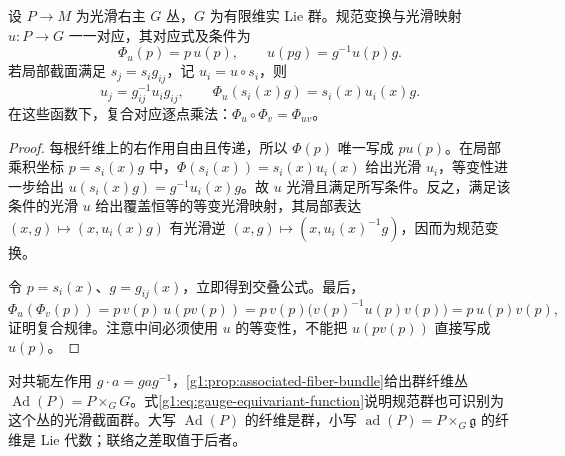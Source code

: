 \begin{proposition}\label{g1:prop:gauge-equivariant-functions}
	设 \(P\to M\) 为光滑右主 \(G\) 丛，\(G\) 为有限维实 Lie 群。规范变换与光滑映射 \(u:P\to G\) 一一对应，其对应式及条件为
	\begin{equation}\label{g1:eq:gauge-equivariant-function}
		\Phi_u(p)=p\,u(p),\qquad u(pg)=g^{-1}u(p)g.
	\end{equation}
	若局部截面满足 \(s_j=s_i g_{ij}\)，记 \(u_i=u\circ s_i\)，则
	\[
		u_j=g_{ij}^{-1}u_i g_{ij},\qquad
		\Phi_u(s_i(x)g)=s_i(x)u_i(x)g.
	\]
	在这些函数下，复合对应逐点乘法：\(\Phi_u\circ\Phi_v=\Phi_{uv}\)。
\end{proposition}
\begin{proof}
	每根纤维上的右作用自由且传递，所以 \(\Phi(p)\) 唯一写成 \(p u(p)\)。在局部乘积坐标 \(p=s_i(x)g\) 中，\(\Phi(s_i(x))=s_i(x)u_i(x)\) 给出光滑 \(u_i\)，等变性进一步给出 \(u(s_i(x)g)=g^{-1}u_i(x)g\)。故 \(u\) 光滑且满足所写条件。反之，满足该条件的光滑 \(u\) 给出覆盖恒等的等变光滑映射，其局部表达 \((x,g)\mapsto(x,u_i(x)g)\) 有光滑逆 \((x,g)\mapsto(x,u_i(x)^{-1}g)\)，因而为规范变换。

	令 \(p=s_i(x)\)、\(g=g_{ij}(x)\)，立即得到交叠公式。最后，
	\[
		\Phi_u(\Phi_v(p))=p\,v(p)\,u(pv(p))
		=p\,v(p)\bigl(v(p)^{-1}u(p)v(p)\bigr)=p\,u(p)v(p),
	\]
	证明复合规律。注意中间必须使用 \(u\) 的等变性，不能把 \(u(pv(p))\) 直接写成 \(u(p)\)。
\end{proof}

对共轭左作用 \(g\cdot a=gag^{-1}\)，\cref{g1:prop:associated-fiber-bundle}给出群纤维丛 \(\operatorname{Ad}(P)=P\times_GG\)。式\eqref{g1:eq:gauge-equivariant-function}说明规范群也可识别为这个丛的光滑截面群。大写 \(\operatorname{Ad}(P)\) 的纤维是群，小写 \(\operatorname{ad}(P)=P\times_G\mathfrak g\) 的纤维是 Lie 代数；联络之差取值于后者。

